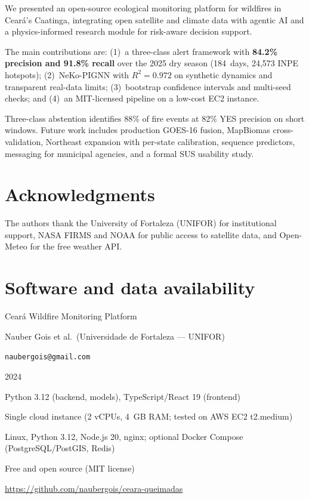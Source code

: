 \documentclass[preprint,12pt,times,numbers]{elsarticle}
\begin{document}
We presented an open-source ecological monitoring platform for wildfires in Ceará's Caatinga, integrating open satellite and climate data with agentic AI and a physics-informed research module for risk-aware decision support.

The main contributions are: (1)~a three-class alert framework with \textbf{84.2\% precision and 91.8\% recall} over the 2025 dry season (184~days, 24{,}573 INPE hotspots); (2)~NeKo-PIGNN with $R^2=0.972$ on synthetic dynamics and transparent real-data limits; (3)~bootstrap confidence intervals and multi-seed checks; and (4)~an MIT-licensed pipeline on a low-cost EC2 instance.

Three-class abstention identifies 88\% of fire events at 82\% YES precision on short windows. Future work includes production GOES-16 fusion, MapBiomas cross-validation, Northeast expansion with per-state calibration, sequence predictors, messaging for municipal agencies, and a formal SUS usability study.

\section*{Acknowledgments}

The authors thank the University of Fortaleza (UNIFOR) for institutional support, NASA FIRMS and NOAA for public access to satellite data, and Open-Meteo for the free weather API.

\section*{Software and data availability}

\begin{description}\setlength{\itemsep}{0.15em}
    \item[Name of software:] Cear\'{a} Wildfire Monitoring Platform
    \item[Developers:] Nauber Gois et al.\ (Universidade de Fortaleza --- UNIFOR)
    \item[Contact:] \texttt{naubergois@gmail.com}
    \item[Year first available:] 2024
    \item[Program language:] Python 3.12 (backend, models), TypeScript/React 19 (frontend)
    \item[Hardware requirements:] Single cloud instance (2 vCPUs, 4~GB RAM; tested on AWS EC2 t2.medium)
    \item[Software requirements:] Linux, Python 3.12, Node.js 20, nginx; optional Docker Compose (PostgreSQL/PostGIS, Redis)
    \item[Cost:] Free and open source (MIT license)
    \item[Availability:] \url{https://github.com/naubergois/ceara-queimadas}
\end{description}
\end{document}
